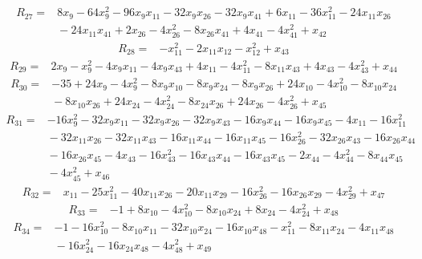 \begin{align*}
R_{27}={}& 8x_{9} - 64x_{9}^{2} - 96x_{9}x_{11} - 32x_{9}x_{26} - 32x_{9}x_{41} + 6x_{11} - 36x_{11}^{2} - 24x_{11}x_{26} \\
&{} - 24x_{11}x_{41} + 2x_{26} - 4x_{26}^{2} - 8x_{26}x_{41} + 4x_{41} - 4x_{41}^{2} + x_{42}
\end{align*}
\begin{align*}
R_{28}={}& -x_{11}^{2} - 2x_{11}x_{12} - x_{12}^{2} + x_{43}
\end{align*}
\begin{align*}
R_{29}={}& 2x_{9} - x_{9}^{2} - 4x_{9}x_{11} - 4x_{9}x_{43} + 4x_{11} - 4x_{11}^{2} - 8x_{11}x_{43} + 4x_{43} - 4x_{43}^{2} + x_{44}
\end{align*}
\begin{align*}
R_{30}={}& -35 + 24x_{9} - 4x_{9}^{2} - 8x_{9}x_{10} - 8x_{9}x_{24} - 8x_{9}x_{26} + 24x_{10} - 4x_{10}^{2} - 8x_{10}x_{24} \\
&{} - 8x_{10}x_{26} + 24x_{24} - 4x_{24}^{2} - 8x_{24}x_{26} + 24x_{26} - 4x_{26}^{2} + x_{45}
\end{align*}
\begin{align*}
R_{31}={}& -16x_{9}^{2} - 32x_{9}x_{11} - 32x_{9}x_{26} - 32x_{9}x_{43} - 16x_{9}x_{44} - 16x_{9}x_{45} - 4x_{11} - 16x_{11}^{2} \\
&{} - 32x_{11}x_{26} - 32x_{11}x_{43} - 16x_{11}x_{44} - 16x_{11}x_{45} - 16x_{26}^{2} - 32x_{26}x_{43} - 16x_{26}x_{44} \\
&{} - 16x_{26}x_{45} - 4x_{43} - 16x_{43}^{2} - 16x_{43}x_{44} - 16x_{43}x_{45} - 2x_{44} - 4x_{44}^{2} - 8x_{44}x_{45} \\
&{} - 4x_{45}^{2} + x_{46}
\end{align*}
\begin{align*}
R_{32}={}& x_{11} - 25x_{11}^{2} - 40x_{11}x_{26} - 20x_{11}x_{29} - 16x_{26}^{2} - 16x_{26}x_{29} - 4x_{29}^{2} + x_{47}
\end{align*}
\begin{align*}
R_{33}={}& -1 + 8x_{10} - 4x_{10}^{2} - 8x_{10}x_{24} + 8x_{24} - 4x_{24}^{2} + x_{48}
\end{align*}
\begin{align*}
R_{34}={}& -1 - 16x_{10}^{2} - 8x_{10}x_{11} - 32x_{10}x_{24} - 16x_{10}x_{48} - x_{11}^{2} - 8x_{11}x_{24} - 4x_{11}x_{48} \\
&{} - 16x_{24}^{2} - 16x_{24}x_{48} - 4x_{48}^{2} + x_{49}
\end{align*}
